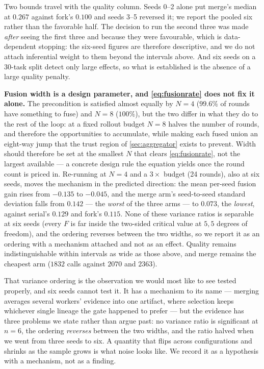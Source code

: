 \documentclass{article}
\begin{document}
Two bounds travel with the quality column. Seeds 0--2 alone put merge's median at $0.267$ against fork's $0.100$ and seeds 3--5 reversed it; we report the pooled six rather than the favorable half. The decision to run the second three was made \emph{after} seeing the first three and because they were favourable, which is data-dependent stopping: the six-seed figures are therefore descriptive, and we do not attach inferential weight to them beyond the intervals above. And six seeds on a 30-task split detect only large effects, so what is established is the absence of a large quality penalty.

\textbf{Fusion width is a design parameter, and \cref{eq:fusionrate} does not fix it alone.} The precondition is satisfied almost equally by $N{=}4$ ($99.6\%$ of rounds have something to fuse) and $N{=}8$ ($100\%$), but the two differ in what they do to the rest of the loop: at a fixed rollout budget $N{=}8$ halves the number of rounds, and therefore the opportunities to accumulate, while making each fused union an eight-way jump that the trust region of \cref{sec:aggregator} exists to prevent. Width should therefore be set at the smallest $N$ that clears \cref{eq:fusionrate}, not the largest available --- a concrete design rule the equation yields once the round count is priced in. Re-running at $N{=}4$ and a $3\times$ budget (24 rounds), also at six seeds, moves the mechanism in the predicted direction: the mean per-seed fusion gain rises from $-0.135$ to $-0.045$, and the merge arm's seed-to-seed standard deviation falls from $0.142$ --- the \emph{worst} of the three arms --- to $0.073$, the \emph{lowest}, against serial's $0.129$ and fork's $0.115$. None of these variance ratios is separable at six seeds (every $F$ is far inside the two-sided critical value at $5,5$ degrees of freedom), and the ordering reverses between the two widths, so we report it as an ordering with a mechanism attached and not as an effect. Quality remains indistinguishable within intervals as wide as those above, and merge remains the cheapest arm ($1832$ calls against $2070$ and $2363$).

That variance ordering is the observation we would most like to see tested properly, and six seeds cannot test it. It has a mechanism to its name --- merging averages several workers' evidence into one artifact, where selection keeps whichever single lineage the gate happened to prefer --- but the evidence has three problems we state rather than argue past: no variance ratio is significant at $n{=}6$, the ordering \emph{reverses} between the two widths, and the ratio halved when we went from three seeds to six. A quantity that flips across configurations and shrinks as the sample grows is what noise looks like. We record it as a hypothesis with a mechanism, not as a finding.
\end{document}
